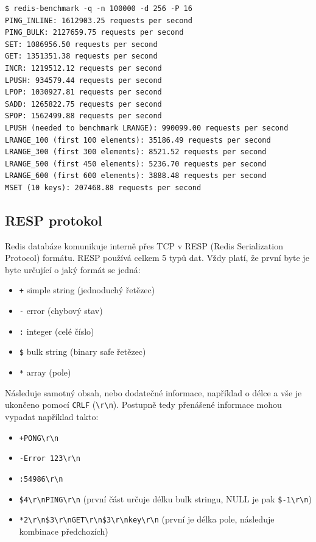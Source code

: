 \begin{verbatim}
$ redis-benchmark -q -n 100000 -d 256 -P 16
PING_INLINE: 1612903.25 requests per second
PING_BULK: 2127659.75 requests per second
SET: 1086956.50 requests per second
GET: 1351351.38 requests per second
INCR: 1219512.12 requests per second
LPUSH: 934579.44 requests per second
LPOP: 1030927.81 requests per second
SADD: 1265822.75 requests per second
SPOP: 1562499.88 requests per second
LPUSH (needed to benchmark LRANGE): 990099.00 requests per second
LRANGE_100 (first 100 elements): 35186.49 requests per second
LRANGE_300 (first 300 elements): 8521.52 requests per second
LRANGE_500 (first 450 elements): 5236.70 requests per second
LRANGE_600 (first 600 elements): 3888.48 requests per second
MSET (10 keys): 207468.88 requests per second
\end{verbatim}


\subsection{RESP protokol}
Redis databáze komunikuje interně přes TCP v RESP (Redis Serialization Protocol) formátu. RESP používá celkem 5 typů dat. Vždy platí, že první byte je byte určující o jaký formát se jedná:

\begin{itemize}
\itemsep0em
\item \texttt{+} simple string (jednoduchý řetězec)
\item \texttt{-} error (chybový stav)
\item \texttt{:} integer (celé číslo)
\item \texttt{\$} bulk string (binary safe řetězec)
\item \texttt{*} array (pole)
\end{itemize}

Následuje samotný obsah, nebo dodatečné informace, například o délce a vše je ukončeno pomocí \texttt{CRLF} (\texttt{\textbackslash r\textbackslash n}). Postupně tedy přenášené informace mohou vypadat například takto:

\begin{itemize}
\itemsep0em
\item \texttt{+PONG\textbackslash r\textbackslash n}
\item \texttt{-Error 123\textbackslash r\textbackslash n}
\item \texttt{:54986\textbackslash r\textbackslash n}
\item \texttt{\$4\textbackslash r\textbackslash nPING\textbackslash r\textbackslash n} (první část určuje délku bulk stringu, NULL je pak \texttt{\$-1\textbackslash r\textbackslash n})
\item \texttt{*2\textbackslash r\textbackslash n\$3\textbackslash r\textbackslash nGET\textbackslash r\textbackslash n\$3\textbackslash r\textbackslash nkey\textbackslash r\textbackslash n} (první je délka pole, následuje kombinace předchozích)
\end{itemize}

